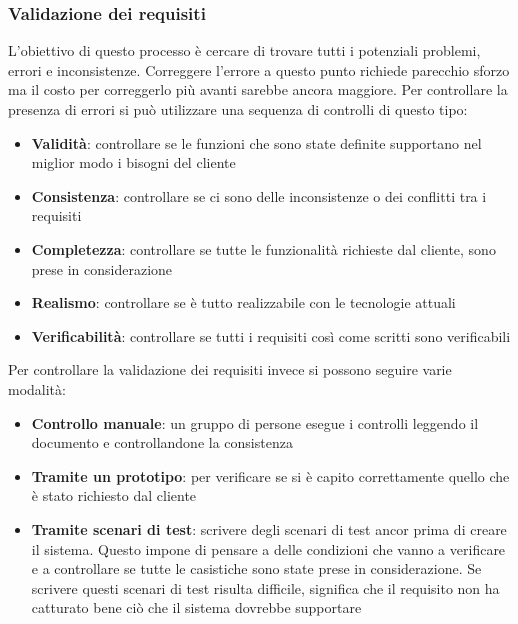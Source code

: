 \subsubsection{Validazione dei requisiti}
L'obiettivo di questo processo è cercare di trovare tutti i potenziali problemi, errori e inconsistenze.
Correggere l'errore a questo punto richiede parecchio sforzo ma il costo per correggerlo più avanti sarebbe ancora maggiore.
Per controllare la presenza di errori si può utilizzare una sequenza di controlli di questo tipo:
\begin{itemize}[noitemsep]
    \item \textbf{Validità}: controllare se le funzioni che sono state definite supportano nel miglior modo i bisogni del cliente
    \item \textbf{Consistenza}: controllare se ci sono delle inconsistenze o dei conflitti tra i requisiti
    \item \textbf{Completezza}: controllare se tutte le funzionalità richieste dal cliente, sono prese in considerazione
    \item \textbf{Realismo}: controllare se è tutto realizzabile con le tecnologie attuali
    \item \textbf{Verificabilità}: controllare se tutti i requisiti così come scritti sono verificabili
\end{itemize}
Per controllare la validazione dei requisiti invece si possono seguire varie modalità:
\begin{itemize}[noitemsep]
    \item \textbf{Controllo manuale}: un gruppo di persone esegue i controlli leggendo il documento e controllandone la consistenza
    \item \textbf{Tramite un prototipo}: per verificare se si è capito correttamente quello che è stato richiesto dal cliente
    \item \textbf{Tramite scenari di test}: scrivere degli scenari di test ancor prima di creare il sistema. Questo impone di pensare a delle condizioni che vanno a verificare e a controllare se tutte le casistiche sono state prese in considerazione. Se scrivere questi scenari di test risulta difficile, significa che il requisito non ha catturato bene ciò che il sistema dovrebbe supportare
\end{itemize}

